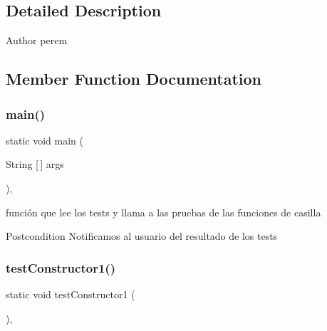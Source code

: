 \subsection{Detailed Description}
\begin{DoxyAuthor}{Author}
perem 
\end{DoxyAuthor}


\subsection{Member Function Documentation}
\mbox{\label{class_dominio_1_1controladores_1_1_drivers_1_1_driver_casilla_a31b15a500be1892e96d81c271adffacb}} 
\subsubsection{main()}
{\footnotesize\ttfamily static void main (\begin{DoxyParamCaption}\item[{String [$\,$]}]{args }\end{DoxyParamCaption})\hspace{0.3cm}{\ttfamily [inline]}, {\ttfamily [static]}}



función que lee los tests y llama a las pruebas de las funciones de casilla 

\begin{DoxyPostcond}{Postcondition}
Notificamos al usuario del resultado de los tests 
\end{DoxyPostcond}
\mbox{\label{class_dominio_1_1controladores_1_1_drivers_1_1_driver_casilla_a6ff5d8ddaf3d8106a0d83f8cf237db84}} 
\subsubsection{test\+Constructor1()}
{\footnotesize\ttfamily static void test\+Constructor1 (\begin{DoxyParamCaption}{ }\end{DoxyParamCaption})\hspace{0.3cm}{\ttfamily [inline]}, {\ttfamily [static]}}



